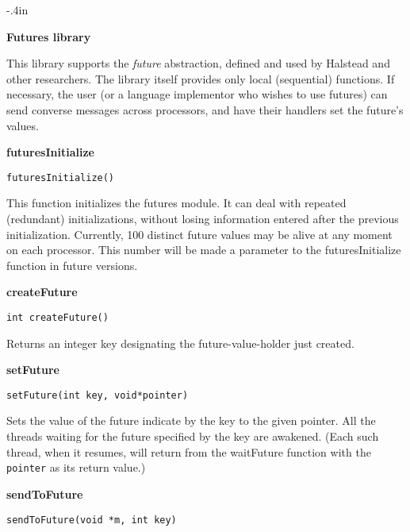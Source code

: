 \setcounter{topnumber}{2}
\def\topfraction{1}
\setcounter{bottomnumber}{1}
\def\bottomfraction{1}
\setcounter{totalnumber}{3}
\def\textfraction{0.2}
\def\floatpagefraction{0.8}
 
\setlength{\parindent}{0.0in}
\setlength{\parskip}{0.1in}
\setlength{\textwidth}{6.5in}
\setlength{\itemindent}{1in}
\setlength{\textheight}{9.5in}
\addtolength{\oddsidemargin}{0in}
\addtolength{\topmargin}{-0.4in}
 
\textwidth 6.4in
\textheight 8.9in
\topmargin -.4in
\oddsidemargin 0.25in
\evensidemargin 0.25in
\parskip 0.1in




\begin{center}

{\Large \bf Futures library}
\end{center}
This library supports the {\em future} abstraction, defined and used by
Halstead and other researchers. The library itself provides only
local (sequential) functions. If necessary, the user (or a language
implementor who wishes to use futures) can send converse messages
across processors, and have their handlers set the future's values.

{\large \bf futuresInitialize}

\verb#futuresInitialize()#

This function initializes the futures module. It can deal with
repeated (redundant) initializations, without losing information
entered after the previous initialization. Currently, 100 distinct
future values may be alive at any moment on each processor. This
number will be made a parameter to the futuresInitialize function in
future versions.

{\large \bf createFuture}

\verb#int createFuture()#

Returns an integer key designating the future-value-holder just
created.


{\large \bf setFuture}

\verb#setFuture(int key, void*pointer)#

Sets the value of the future indicate by the key to the given pointer.
All the threads waiting for the future specified by the key are
awakened. (Each such thread, when it resumes, will return from the
waitFuture function with the \verb#pointer# as its return value.)

{\large \bf sendToFuture}

\verb#sendToFuture(void *m, int key)#

